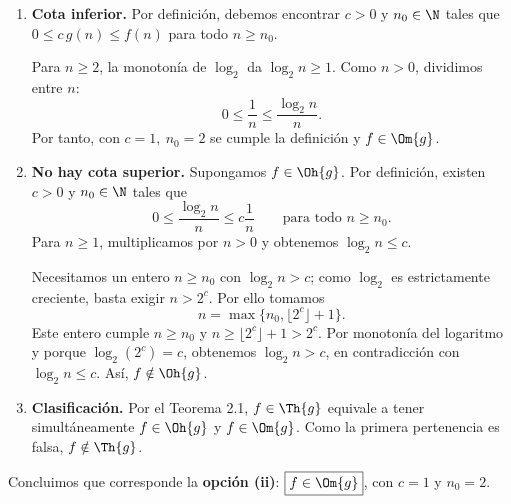 
\begin{enumerate}
\item \textbf{Cota inferior.} Por definición, debemos encontrar $c>0$ y $n_0\in\N$ tales que $0\le c\,g(n)\le f(n)$ para todo $n\ge n_0$.

Para $n\ge2$, la monotonía de $\log_2$ da $\log_2 n\ge1$. Como $n>0$, dividimos entre $n$:
\[
0\le\frac1n\le\frac{\log_2 n}{n}.
\]
Por tanto, con $\boxed{c=1,\ n_0=2}$ se cumple la definición y $f\in\Om{g}$.

\item \textbf{No hay cota superior.} Supongamos $f\in\Oh{g}$. Por definición, existen $c>0$ y $n_0\in\N$ tales que
\[
0\le\frac{\log_2 n}{n}\le c\frac1n
\qquad\text{para todo }n\ge n_0.
\]
Para $n\ge1$, multiplicamos por $n>0$ y obtenemos $\log_2 n\le c$.

Necesitamos un entero $n\ge n_0$ con $\log_2 n>c$; como $\log_2$ es estrictamente creciente, basta exigir $n>2^c$. Por ello tomamos
\[
n=\max\{n_0,\lfloor2^c\rfloor+1\}.
\]
Este entero cumple $n\ge n_0$ y $n\ge\lfloor2^c\rfloor+1>2^c$. Por monotonía del logaritmo y porque $\log_2(2^c)=c$, obtenemos $\log_2 n>c$, en contradicción con $\log_2 n\le c$. Así, $f\notin\Oh{g}$.

\item \textbf{Clasificación.} Por el Teorema 2.1, $f\in\Th{g}$ equivale a tener simultáneamente $f\in\Oh{g}$ y $f\in\Om{g}$. Como la primera pertenencia es falsa, $f\notin\Th{g}$.
\end{enumerate}

Concluimos que corresponde la \textbf{opción (ii)}: $\boxed{f\in\Om{g}}$, con $c=1$ y $n_0=2$.
\fin
